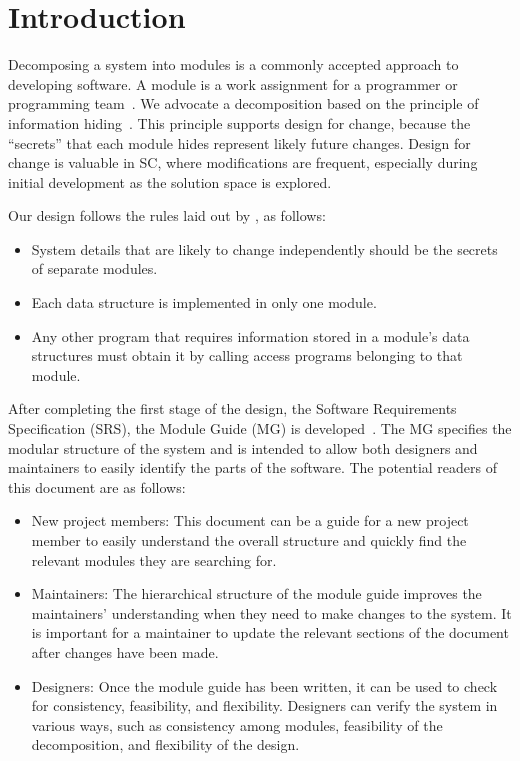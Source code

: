\documentclass[12pt, titlepage]{article}
\begin{document}
\newpage

\tableofcontents

\listoftables

\listoffigures

\newpage


\section{Introduction}

Decomposing a system into modules is a commonly accepted approach to developing
software.  A module is a work assignment for a programmer or programming
team~\citep{ParnasEtAl1984}.  We advocate a decomposition
based on the principle of information hiding~\citep{Parnas1972a}.  This
principle supports design for change, because the ``secrets'' that each module
hides represent likely future changes.  Design for change is valuable in SC,
where modifications are frequent, especially during initial development as the
solution space is explored.

Our design follows the rules laid out by \citet{ParnasEtAl1984}, as follows:
\begin{itemize}
\item System details that are likely to change independently should be the
  secrets of separate modules.
\item Each data structure is implemented in only one module.
\item Any other program that requires information stored in a module's data
  structures must obtain it by calling access programs belonging to that module.
\end{itemize}

After completing the first stage of the design, the Software Requirements
Specification (SRS), the Module Guide (MG) is developed~\citep{ParnasEtAl1984}. The MG
specifies the modular structure of the system and is intended to allow both
designers and maintainers to easily identify the parts of the software.  The
potential readers of this document are as follows:

\begin{itemize}
\item New project members: This document can be a guide for a new project member
  to easily understand the overall structure and quickly find the
  relevant modules they are searching for.
\item Maintainers: The hierarchical structure of the module guide improves the
  maintainers' understanding when they need to make changes to the system. It is
  important for a maintainer to update the relevant sections of the document
  after changes have been made.
\item Designers: Once the module guide has been written, it can be used to
  check for consistency, feasibility, and flexibility. Designers can verify the
  system in various ways, such as consistency among modules, feasibility of the
  decomposition, and flexibility of the design.
\end{itemize}
\end{document}
